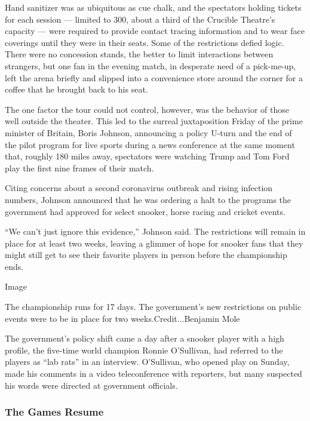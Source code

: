 Hand sanitizer was as ubiquitous as cue chalk, and the spectators
holding tickets for each session --- limited to 300, about a third of
the Crucible Theatre's capacity --- were required to provide contact
tracing information and to wear face coverings until they were in their
seats. Some of the restrictions defied logic. There were no concession
stands, the better to limit interactions between strangers, but one fan
in the evening match, in desperate need of a pick-me-up, left the arena
briefly and slipped into a convenience store around the corner for a
coffee that he brought back to his seat.

The one factor the tour could not control, however, was the behavior of
those well outside the theater. This led to the surreal juxtaposition
Friday of the prime minister of Britain, Boris Johnson, announcing a
policy U-turn and the end of the pilot program for live sports during a
news conference at the same moment that, roughly 180 miles away,
spectators were watching Trump and Tom Ford play the first nine frames
of their match.

Citing concerns about a second coronavirus outbreak and rising infection
numbers, Johnson announced that he was ordering a halt to the programs
the government had approved for select snooker, horse racing and cricket
events.

``We can't just ignore this evidence,'' Johnson said. The restrictions
will remain in place for at least two weeks, leaving a glimmer of hope
for snooker fans that they might still get to see their favorite players
in person before the championship ends.

Image

The championship runs for 17 days. The government's new restrictions on
public events were to be in place for two weeks.Credit...Benjamin Mole

The government's policy shift came a day after a snooker player with a
high profile, the five-time world champion Ronnie O'Sullivan, had
referred to the players as ``lab rats'' in an interview. O'Sullivan, who
opened play on Sunday, made his comments in a video teleconference with
reporters, but many suspected his words were directed at government
officials.

\hypertarget{the-games-resume}{%
\subsubsection{The Games Resume}\label{the-games-resume}}

